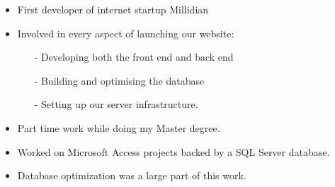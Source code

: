 \documentclass[10pt,a4paper]{../altacv}
\begin{document}



\medskip\medskip{}

\begin{itemize}
\item\small{First developer of internet startup Millidian}
\item\small{Involved in every aspect of launching our website:}
\begin{itemize}
\item[-]\small{Developing both the front end and back end}
\item[-]\small{Building and optimising the database}
\item[-]\small{Setting up our server infrastructure.}
\end{itemize}
\end{itemize}




\medskip\medskip{}

\begin{itemize}
	\item\small{Part time work while doing my Master degree.}
	\item\small{Worked on Microsoft Access projects backed by a SQL Server database.}
	\item\small{Database optimization was a large part of this work.}
\end{itemize}










\newpage
\end{document}

